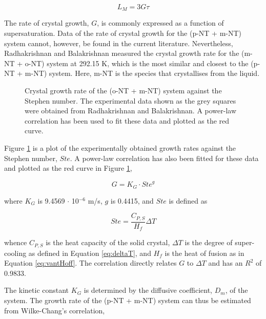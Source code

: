 \begin{equation} \label{eq:LM G tau}
    L_M = 3 G \tau
\end{equation}

The rate of crystal growth, $G$, is commonly expressed as a function of supersaturation. Data of the rate of crystal growth for the (p-NT + m-NT) system cannot, however, be found in the current literature. Nevertheless, Radhakrishnan and Balakrishnan measured the crystal growth rate for the (m-NT + o-NT) system at 292.15 K, which is the most similar and closest to the (p-NT + m-NT) system. \cite{radhakrishnan_kinetics_1999} Here, m-NT is the species that crystallises from the liquid.

\begin{figure}[h]
    \centering
    
    \caption{Crystal growth rate of the (o-NT + m-NT) system against the Stephen number. The experimental data shown as the grey squares were obtained from Radhakrishnan and Balakrishnan. \cite{radhakrishnan_kinetics_1999} A power-law correlation has been used to fit these data and plotted as the red curve.}
    \label{fig:o-NT + m-NT kinetics}
\end{figure}

Figure \ref{fig:o-NT + m-NT kinetics} is a plot of the experimentally obtained growth rates against the Stephen number, $Ste$. A power-law correlation has also been fitted for these data and plotted as the red curve in Figure \ref{fig:o-NT + m-NT kinetics},

\begin{equation}  \label{eq:KG Ste g}
    G = K_G \cdot {Ste}^{g}
\end{equation}

\noindent where $K_G$ is 9.4569 $\cdot$ 10$^{-6}$ m/s, $g$ is 0.4415, and $Ste$ is defined as 

\begin{equation}
    Ste = \frac{C_{P,S}}{H_{f}} \Delta T
\end{equation}

\noindent whence $C_{P,S}$ is the heat capacity of the solid crystal, $\Delta T$ is the degree of super-cooling as defined in Equation \ref{eq:deltaT}, and $H_{f}$ is the heat of fusion as in Equation \ref{eq:vantHoff}. The correlation directly relates $G$ to $\Delta T$ and has an $R^2$ of 0.9833.

The kinetic constant $K_G$ is determined by the diffusive coefficient, $D_m$, of the system. The growth rate of the (p-NT + m-NT) system can thus be estimated from Wilke-Chang's correlation, \cite{miyabe_estimation_2011}

